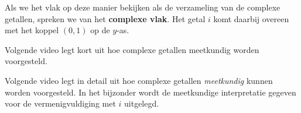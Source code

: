 \documentclass{ximera}
\begin{document}
Als we het vlak op deze manier bekijken als de verzameling van de complexe getallen, spreken we van het \textbf{complexe vlak}. Het getal $i$ komt daarbij overeen met het koppel $(0,1)$ op de $y$-as.

\begin{xmuitweiding}\nl

	Volgende video legt kort uit hoe complexe getallen meetkundig worden voorgesteld.



Volgende video legt in detail uit hoe complexe getallen \textit{meetkundig} kunnen worden voorgesteld.
In het bijzonder wordt de meetkundige interpretatie gegeven voor de vermenigvuldiging met $i$ uitgelegd.


\end{xmuitweiding}
\end{document}
